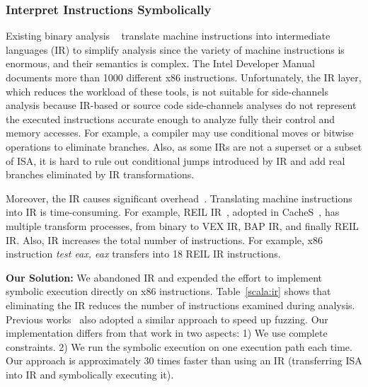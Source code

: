 \subsubsection{Interpret Instructions Symbolically}
Existing binary analysis ~\cite{shoshitaishvili2016state,
10.1007/978-3-642-22110-1_37, song2008bitblaze} translate machine instructions into
intermediate languages (IR) to simplify analysis since
the variety of machine instructions is
enormous, and their semantics is complex. The Intel Developer
Manual~\cite{intelsys} documents more than 1000 different x86 instructions. 
Unfortunately, the IR layer, which
reduces the workload of these tools, is not suitable for side-channels 
analysis because
IR-based or source code side-channels analyses do not represent the executed instructions accurate enough to analyze fully their control and memory accesses.
For example, a compiler may use conditional moves or bitwise operations to eliminate
branches. Also, as some IRs are not a superset or a subset of ISA, 
it is hard to rule out conditional jumps introduced by IR and add real branches 
eliminated by IR transformations.

Moreover, the IR causes significant overhead~\cite{217563}.
Translating machine instructions into IR is time-consuming. For example,
REIL IR~\cite{dullien2009reil}, adopted in CacheS~\cite{236338}, has multiple
transform processes, from binary to VEX IR, BAP IR, and finally REIL IR\@. 
Also, IR increases the total number of instructions. For example, x86
instruction \textit{test eax, eax} transfers into 18 REIL IR instructions. 

\textbf{Our Solution:}
We abandoned IR and expended the effort to implement 
symbolic execution directly on x86 instructions. 
Table~\ref{scala:ir} shows that eliminating the IR reduces the number 
of instructions examined during analysis. Previous works~\cite{217563} also 
adopted a similar approach to speed up fuzzing. Our implementation differs
from that work in two aspects: 1) We use complete constraints. 2) We run the
symbolic execution on one execution path each time. Our approach is approximately 30 times faster than using an IR (transferring ISA into IR and
symbolically executing it).

